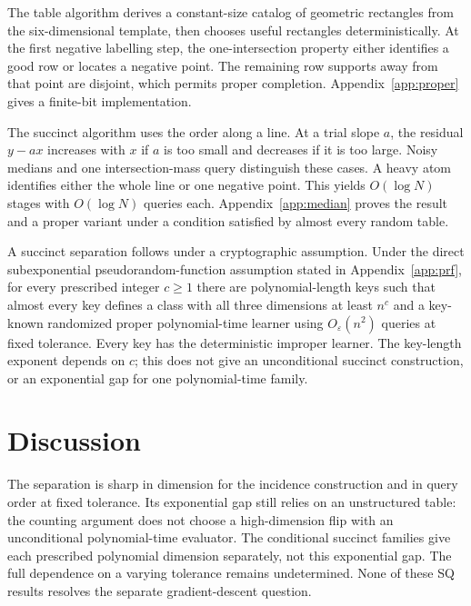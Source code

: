 \documentclass[11pt,letterpaper,pmlr,twoside]{jmlr}
\newif\ifreview
\newcommand{\eps}{\varepsilon}
\begin{document}
The table algorithm derives a constant-size catalog of geometric rectangles from the six-dimensional template, then chooses useful rectangles deterministically. At the first negative labelling step, the one-intersection property either identifies a good row or locates a negative point. The remaining row supports away from that point are disjoint, which permits proper completion. Appendix~\ref{app:proper} gives a finite-bit implementation.

The succinct algorithm uses the order along a line. At a trial slope $a$, the residual $y-ax$ increases with $x$ if $a$ is too small and decreases if it is too large. Noisy medians and one intersection-mass query distinguish these cases. A heavy atom identifies either the whole line or one negative point. This yields $O(\log N)$ stages with $O(\log N)$ queries each. Appendix~\ref{app:median} proves the result and a proper variant under a condition satisfied by almost every random table.

A succinct separation follows under a cryptographic assumption. Under the direct subexponential pseudorandom-function assumption stated in Appendix~\ref{app:prf}, for every prescribed integer $c\ge1$ there are polynomial-length keys such that almost every key defines a class with all three dimensions at least $n^c$ and a key-known randomized proper polynomial-time learner using $O_\eps(n^2)$ queries at fixed tolerance. Every key has the deterministic improper learner. The key-length exponent depends on $c$; this does not give an unconditional succinct construction, or an exponential gap for one polynomial-time family.

\section{Discussion}\label{sec:open}
The separation is sharp in dimension for the incidence construction and in query order at fixed tolerance. Its exponential gap still relies on an unstructured table: the counting argument does not choose a high-dimension flip with an unconditional polynomial-time evaluator. The conditional succinct families give each prescribed polynomial dimension separately, not this exponential gap. The full dependence on a varying tolerance remains undetermined. None of these SQ results resolves the separate gradient-descent question.

\ifreview\else
{}
\fi
\end{document}
